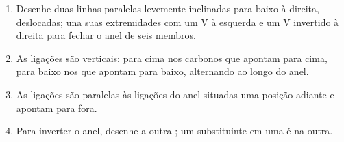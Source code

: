 \begin{method}\label{met:b1:stereochemistry-in-depth:draw-chair}
\begin{enumerate}
  \item Desenhe duas linhas paralelas levemente inclinadas para baixo à
        direita, deslocadas; una suas extremidades com um V à esquerda e
        um V invertido à direita para fechar o anel de seis membros.
  \item As ligações  são verticais: para cima nos carbonos que
        apontam para cima, para baixo nos que apontam para baixo,
        alternando ao longo do anel.
  \item As ligações  são paralelas às ligações do anel
        situadas uma posição adiante e apontam para fora.
  \item Para inverter o anel, desenhe a outra ; um substituinte
         em uma é  na outra.
\end{enumerate}
\end{method}

